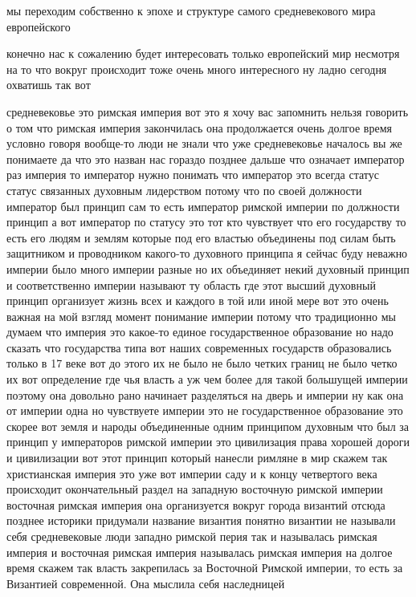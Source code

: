 мы переходим собственно к эпохе и
структуре самого средневекового мира европейского 

конечно нас к сожалению будет
интересовать только европейский мир несмотря на то что вокруг происходит тоже
очень много интересного ну ладно сегодня охватишь так вот 

средневековье это
римская империя вот это я хочу вас запомнить нельзя говорить о том что римская
империя закончилась она продолжается очень долгое время условно говоря вообще-то
люди не знали что уже средневековье началось вы же понимаете да что это назван
нас гораздо позднее дальше что означает император раз империя то император нужно
понимать что император это всегда статус статус связанных духовным лидерством
потому что по своей должности император был принцип сам то есть император
римской империи по должности принцип а вот император по статусу это тот кто
чувствует что его государству то есть его людям и землям которые под его властью
объединены под силам быть защитником и проводником какого-то духовного принципа
я сейчас буду неважно империи было много империи разные но их объединяет некий
духовный принцип и соответственно империи называют ту область где этот высший
духовный принцип организует жизнь всех и каждого в той или иной мере вот это
очень важная на мой взгляд момент понимание империи потому что традиционно мы
думаем что империя это какое-то единое государственное образование но надо
сказать что государства типа вот наших современных государств образовались
только в 17 веке вот до этого их не было не было четких границ не было четко их
вот определение где чья власть а уж чем более для такой большущей империи
поэтому она довольно рано начинает разделяться на дверь и империи ну как она от
империи одна но чувствуете империи это не государственное образование это скорее
вот земля и народы объединенные одним принципом духовным что был за принцип у
императоров римской империи это цивилизация права хорошей дороги и цивилизации
вот этот принцип который нанесли римляне в мир скажем так христианская империя
это уже вот империи саду и к концу четвертого века происходит окончательный
раздел на западную восточную римской империи восточная римская империя она
организуется вокруг города византий отсюда позднее историки придумали название
византия понятно византии не называли себя средневековые люди западно римской
перия так и называлась римская империя и восточная римская империя называлась
римская империя на долгое время скажем так власть закрепилась за Восточной
Римской империи, то есть за Византией современной. Она мыслила себя наследницей
